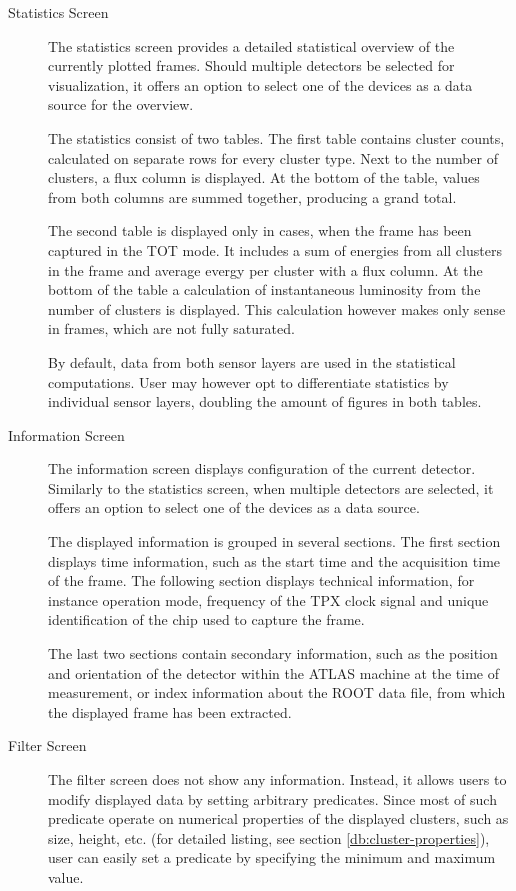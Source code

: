\begin{description}
	\item[Statistics Screen]
	The statistics screen provides a detailed statistical overview of the currently plotted frames. Should multiple detectors be selected for visualization, it offers an option to select one of the devices as a data source for the overview.

	The statistics consist of two tables. The first table contains cluster counts, calculated on separate rows for every cluster type. Next to the number of clusters, a flux column is displayed. At the bottom of the table, values from both columns are summed together, producing a grand total.

	The second table is displayed only in cases, when the frame has been captured in the TOT mode. It includes a sum of energies from all clusters in the frame and average evergy per cluster with a flux column. At the bottom of the table a calculation of instantaneous luminosity from the number of clusters is displayed. This calculation however makes only sense in frames, which are not fully saturated.

	By default, data from both sensor layers are used in the statistical computations. User may however opt to differentiate statistics by individual sensor layers, doubling the amount of figures in both tables.

	\item[Information Screen]
	The information screen displays configuration of the current detector. Similarly to the statistics screen, when multiple detectors are selected, it offers an option to select one of the devices as a data source.

	The displayed information is grouped in several sections. The first section displays time information, such as the start time and the acquisition time of the frame. The following section displays technical information, for instance operation mode, frequency of the TPX clock signal and unique identification of the chip used to capture the frame.

	The last two sections contain secondary information, such as the position and orientation of the detector within the ATLAS machine at the time of measurement, or index information about the ROOT data file, from which the displayed frame has been extracted.

	\item[Filter Screen]
	The filter screen does not show any information. Instead, it allows users to modify displayed data by setting arbitrary predicates. Since most of such predicate operate on numerical properties of the displayed clusters, such as size, height, etc. (for detailed listing, see section \ref{db:cluster-properties}), user can easily set a predicate by specifying the minimum and maximum value.


\end{description}
